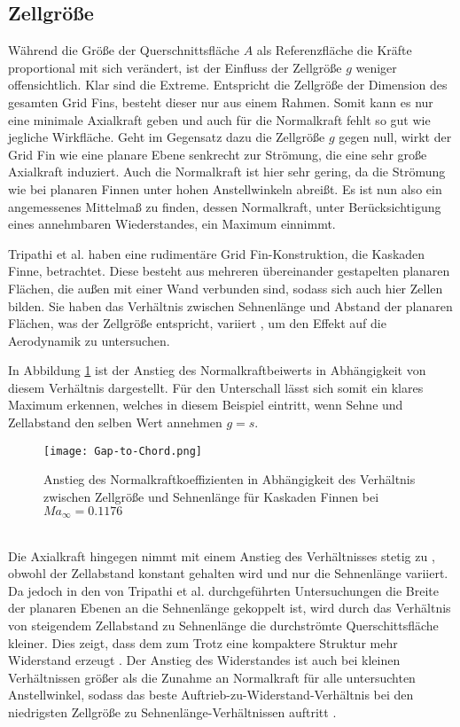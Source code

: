 \subsection{Zellgröße}
Während die Größe der Querschnittsfläche $A$ als Referenzfläche die Kräfte proportional mit sich verändert, ist der Einfluss der Zellgröße $g$ weniger offensichtlich. Klar sind die Extreme. Entspricht die Zellgröße der Dimension des gesamten Grid Fins, besteht dieser nur aus einem Rahmen. Somit kann es nur eine minimale Axialkraft geben und auch für die Normalkraft fehlt so gut wie jegliche Wirkfläche. Geht im Gegensatz dazu die Zellgröße $g$ gegen null, wirkt der Grid Fin wie eine planare Ebene senkrecht zur Strömung, die eine sehr große Axialkraft induziert. Auch die Normalkraft ist hier sehr gering, da die Strömung wie bei planaren Finnen unter hohen Anstellwinkeln abreißt. Es ist nun also ein angemessenes Mittelmaß zu finden, dessen Normalkraft, unter Berücksichtigung eines annehmbaren Wiederstandes, ein Maximum einnimmt.

Tripathi et al. haben eine rudimentäre Grid Fin-Konstruktion, die Kaskaden Finne, betrachtet. Diese besteht aus mehreren übereinander gestapelten planaren Flächen, die außen mit einer Wand verbunden sind, sodass sich auch hier Zellen bilden. Sie haben das Verhältnis zwischen Sehnenlänge und Abstand der planaren Flächen, was der Zellgröße entspricht, variiert \cite{ChordVar}, um den Effekt auf die Aerodynamik zu untersuchen.

In Abbildung \ref{abb_Gap-Chord} ist der Anstieg des Normalkraftbeiwerts in Abhängigkeit von diesem Verhältnis dargestellt. Für den Unterschall lässt sich somit ein klares Maximum erkennen, welches in diesem Beispiel eintritt, wenn Sehne und Zellabstand den selben Wert annehmen $g=s$.
\begin{figure}[h]
	\centering
	\texttt{[image: Gap-to-Chord.png]}
	\begin{flushright}
	\end{flushright}
	\caption{Anstieg des Normalkraftkoeffizienten in Abhängigkeit des Verhältnis zwischen Zellgröße und Sehnenlänge für Kaskaden Finnen bei $Ma_\infty = 0.1176$}
	\label{abb_Gap-Chord}
\end{figure}\\
Die Axialkraft hingegen nimmt mit einem Anstieg des Verhältnisses stetig zu \cite{ChordVar}, obwohl der Zellabstand konstant gehalten wird und nur die Sehnenlänge variiert. Da jedoch in den von Tripathi et al. durchgeführten Untersuchungen die Breite der planaren Ebenen an die Sehnenlänge gekoppelt ist, wird durch das Verhältnis von steigendem Zellabstand zu Sehnenlänge die durchströmte Querschittsfläche kleiner. Dies zeigt, dass dem zum Trotz eine kompaktere Struktur mehr Widerstand erzeugt \cite{ChordVar}. Der Anstieg des Widerstandes ist auch bei kleinen Verhältnissen größer als die Zunahme an Normalkraft für alle untersuchten Anstellwinkel, sodass das beste Auftrieb-zu-Widerstand-Verhältnis bei den niedrigsten Zellgröße zu Sehnenlänge-Verhältnissen auftritt \cite{ChordVar}.

